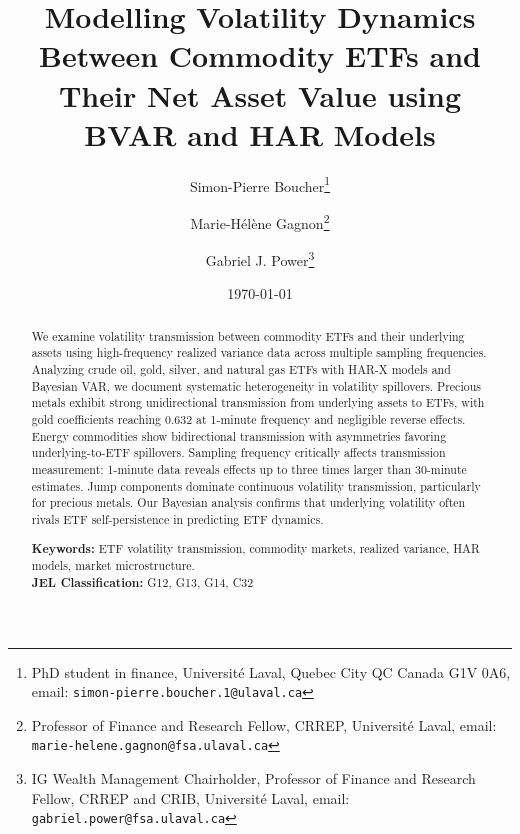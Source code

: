 \documentclass[12pt]{article}
\title{\textbf{Modelling Volatility Dynamics Between Commodity ETFs and Their Net Asset Value using BVAR and HAR Models}%
}
\author{Simon-Pierre Boucher\footnote{PhD student in finance, Université Laval, Quebec City QC Canada G1V 0A6, email:   \texttt{simon-pierre.boucher.1@ulaval.ca}}\and Marie-H{\'e}l{\`e}ne Gagnon\footnote{Professor of Finance and Research Fellow, CRREP, Université Laval, email: \texttt{marie-helene.gagnon@fsa.ulaval.ca}}\and Gabriel J. Power\footnote{IG Wealth Management Chairholder, Professor of Finance and Research Fellow, CRREP and CRIB, Université Laval, email:   \texttt{gabriel.power@fsa.ulaval.ca}}}
\date{\today}
\begin{document}
\begin{titlepage}
\maketitle

\begin{abstract}
\singlespacing
\noindent 
We examine volatility transmission between commodity ETFs and their underlying assets using high-frequency realized variance data across multiple sampling frequencies. Analyzing crude oil, gold, silver, and natural gas ETFs with HAR-X models and Bayesian VAR, we document systematic heterogeneity in volatility spillovers. Precious metals exhibit strong unidirectional transmission from underlying assets to ETFs, with gold coefficients reaching 0.632 at 1-minute frequency and negligible reverse effects. Energy commodities show bidirectional transmission with asymmetries favoring underlying-to-ETF spillovers. Sampling frequency critically affects transmission measurement: 1-minute data reveals effects up to three times larger than 30-minute estimates. Jump components dominate continuous volatility transmission, particularly for precious metals. Our Bayesian analysis confirms that underlying volatility often rivals ETF self-persistence in predicting ETF dynamics. 

\vspace{0.2in}
\noindent\textbf{Keywords:} ETF volatility transmission, commodity markets, realized variance, HAR models, market microstructure.\\
\textbf{JEL Classification:} G12, G13, G14, C32

\bigskip
\end{abstract}
\doublespacing

\setcounter{page}{0}
\thispagestyle{empty}
\end{titlepage}
\pagebreak \newpage












\doublespacing



\end{document}
